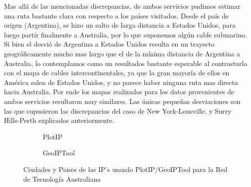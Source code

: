 Mas allá de las mencionadas discrepancias, de ambos servicios pudimos estimar
una ruta bastante clara con respecto a los países visitados. Desde el país de
origen (Argentina), se hizo un salto de larga distancia a Estados Unidos, para
luego partir finalmente a Australia, por lo que suponemos algún cable
submarino. Si bien el desvió de Argentina a Estados Unidos resulta en un
trayecto geográficamente mucho mas largo que el de la mínima distancia de
Argentina a Australia, lo contemplamos como un resultados bastante esperable al
contrastarlo con el mapa de cables intercontinentales, ya que la gran mayoría
de ellos en América salen de Estados Unidos, y no parece haber ninguna ruta mas
directa hacia Australia. Por ende los mapas realizados para los datos
provenientes de ambos servicios resultaron muy similares. Las únicas pequeñas
desviaciones son las que supusieron las discrepancias del caso de New
York-Lousville, y Surry Hills-Perth explicados anteriormente.

\begin{figure}[ht]
	\begin{subfigure}[b]{0.5\textwidth}
		\centering
		
		\caption{PlotIP}
	\end{subfigure}
	\begin{subfigure}[b]{0.5\textwidth}
		\centering
		
		\caption{GeoIPTool}
	\end{subfigure}
	\caption{Ciudades y Paises de las IP's usando PlotIP/GeoIPTool para la Red de Tecnología Australiana}
	\label{fig:lugares_australia}
\end{figure}

